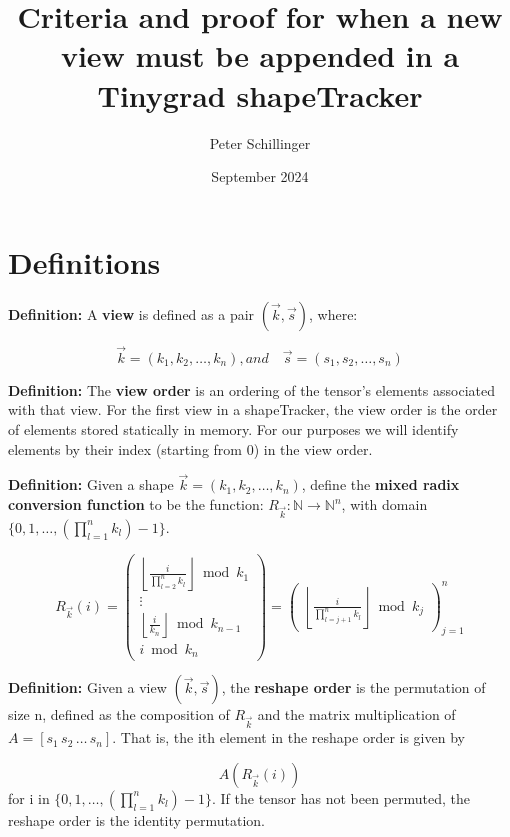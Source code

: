 \documentclass{article}
\title{Criteria and proof for when a new view must be appended in a Tinygrad shapeTracker}
\author{Peter Schillinger}
\date{September 2024}
\begin{document}
\maketitle
\tableofcontents %

\section{Definitions}

\begin{flushleft}
\textbf{Definition:} A \textbf{view} is defined as a pair \((\vec{k}, \vec{s})\), where:
\end{flushleft}
\[
\vec{k} = (k_1, k_2, \ldots, k_n), and \quad \vec{s} = (s_1, s_2, \ldots, s_n)
\]


\textbf{Definition:} The \textbf{view order} is an ordering of the tensor's elements associated with that view. For the first view in a shapeTracker, the view order is the order of elements stored statically in memory. For our purposes we will identify elements by their index (starting from 0) in the view order. 

\begin{flushleft}
\textbf{Definition:} Given a shape $\vec{k} = (k_1, k_2, \ldots, k_n)$, define the \textbf{mixed radix conversion function} to be the function: $R_{\vec{k}} : \mathbb{N} \rightarrow \mathbb{N}^n$, with domain $\{0, 1, \ldots, (\prod_{l=1}^n k_l) - 1\}$.
\end{flushleft}

\[
R_{\vec{k}}(i) = 
\begin{pmatrix}
\left\lfloor \frac{i}{\prod_{l=2}^{n} k_l} \right\rfloor \bmod k_1 \\
\vdots \\
\left\lfloor \frac{i}{k_n} \right\rfloor \bmod k_{n-1} \\
i \bmod k_n
\end{pmatrix}
= 
\begin{pmatrix}
\left\lfloor \frac{i}{\prod_{l=j+1}^{n} k_l} \right\rfloor \bmod k_j
\end{pmatrix}_{j=1}^n
\]

\begin{flushleft}
\textbf{Definition:} Given a view $(\vec{k}, \vec{s})$, the \textbf{reshape order} is the permutation of size n, defined as the composition of $R_{\vec{k}}$ and the matrix multiplication of $A = [s_1 \, s_2 \, \ldots \, s_n]$. That is, the ith element in the reshape order is given by 

\[
A(R_{\vec{k}}(i))
\]
for i in $\{0, 1, \ldots, (\prod_{l=1}^n k_l) - 1\}$. If the tensor has not been permuted, the reshape order is the identity permutation.
\end{flushleft}
\end{document}
